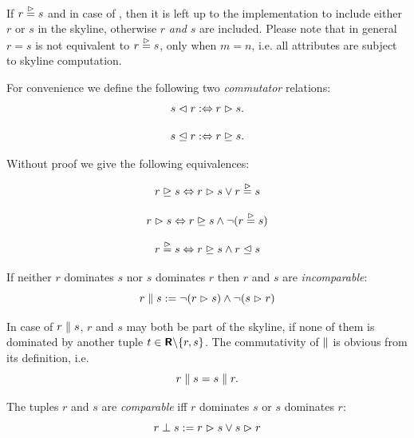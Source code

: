 \noindent
If $r \stackrel{\vartriangleright}{=} s$ and in case of , then it
is left up to the implementation to include either $r$ or $s$ in the
skyline, otherwise $r$ \emph{and} $s$ are included.
%
Please note that in general $r=s$ is not equivalent to $r \stackrel{\vartriangleright}{=} s$,
only when $m = n$, i.e. all attributes are subject to skyline computation.

\bigskip
\noindent
For convenience we define the following two \emph{commutator} relations:
\[
s \vartriangleleft r :\Leftrightarrow r \vartriangleright s.
\]

\[
s \trianglelefteq r :\Leftrightarrow r \trianglerighteq s.
\]

\noindent
Without proof we give the following equivalences:

\begin{equation}\label{eqn:weakdominats-dom-nondistinct}
r \trianglerighteq s \Leftrightarrow r \vartriangleright s \lor r \stackrel{\vartriangleright}{=} s
\end{equation}

\begin{equation}
r \vartriangleright s \Leftrightarrow r \trianglerighteq s \land \neg (r \stackrel{\vartriangleright}{=} s)
\end{equation}

\begin{equation}
r \stackrel{\vartriangleright}{=} s \Leftrightarrow r \trianglerighteq s \land r \trianglelefteq s
\end{equation}



\begin{definition}[Incomparable] If neither $r$ dominates $s$ nor $s$ dominates $r$ then $r$ and $s$ are \emph{incomparable}:
\[
r \parallel s := \neg (r \vartriangleright s) \land \neg (s \vartriangleright r)
\]
\end{definition}

\noindent
In case of $r \parallel s$, $r$ and $s$ may both be part of the
skyline, if none of them is dominated by another tuple $t \in
\textnormal{\bf\textsf{R}} \backslash \{r, s\}$.
%
The commutativity of $\parallel$ is obvious from its definition, i.e.
\[
r \parallel s = s \parallel r.
\]


\begin{definition}[Comparable]The tuples $r$ and $s$ are \emph{comparable} iff $r$ dominates $s$ or $s$ dominates $r$:
\[
r \perp s := r \vartriangleright s \lor s \vartriangleright r
\]
\end{definition}

